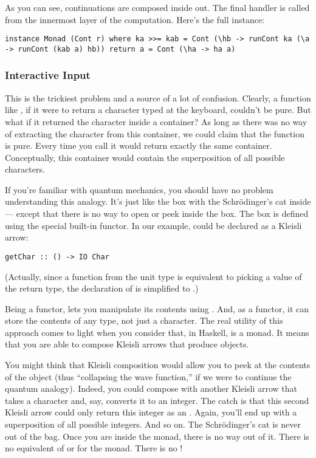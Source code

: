 As you can see, continuations are composed inside out. The final handler
 is called from the innermost layer of the computation.
Here's the full instance:

\begin{verbatim}
instance Monad (Cont r) where ka >>= kab = Cont (\hb -> runCont ka (\a -> runCont (kab a) hb)) return a = Cont (\ha -> ha a)
\end{verbatim}

\subsubsection{Interactive Input}\label{interactive-input}

This is the trickiest problem and a source of a lot of confusion.
Clearly, a function like , if it were to return a
character typed at the keyboard, couldn't be pure. But what if it
returned the character inside a container? As long as there was no way
of extracting the character from this container, we could claim that the
function is pure. Every time you call  it would return
exactly the same container. Conceptually, this container would contain
the superposition of all possible characters.

If you're familiar with quantum mechanics, you should have no problem
understanding this analogy. It's just like the box with the
Schrödinger's cat inside --- except that there is no way to open or peek
inside the box. The box is defined using the special built-in
 functor. In our example,  could be declared
as a Kleisli arrow:

\begin{verbatim}
getChar :: () -> IO Char
\end{verbatim}

(Actually, since a function from the unit type is equivalent to picking
a value of the return type, the declaration of  is
simplified to .)

Being a functor,  lets you manipulate its contents using
. And, as a functor, it can store the contents of any type,
not just a character. The real utility of this approach comes to light
when you consider that, in Haskell,  is a monad. It means
that you are able to compose Kleisli arrows that produce 
objects.

You might think that Kleisli composition would allow you to peek at the
contents of the  object (thus ``collapsing the wave
function,'' if we were to continue the quantum analogy). Indeed, you
could compose  with another Kleisli arrow that takes a
character and, say, converts it to an integer. The catch is that this
second Kleisli arrow could only return this integer as an
. Again, you'll end up with a superposition of all
possible integers. And so on. The Schrödinger's cat is never out of the
bag. Once you are inside the  monad, there is no way out of
it. There is no equivalent of  or 
for the  monad. There is no !

